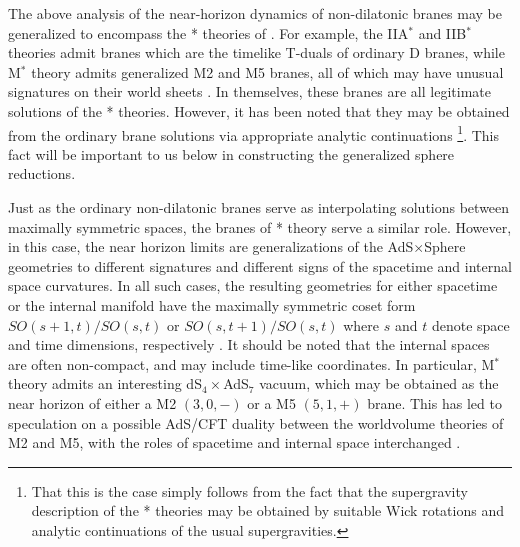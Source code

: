 \documentclass[a4paper,12pt]{article}
\begin{document}
The above analysis of the near-horizon dynamics of non-dilatonic branes
may be generalized to encompass the * theories of \cite{Hull:1998vg,Hull2}.
For example, the IIA$^*$ and IIB$^*$ theories admit branes which are the
timelike T-duals of ordinary D branes, while M$^*$ theory admits
generalized M2 and M5 branes, all of which may have unusual signatures
on their world sheets \cite{Hull3,Hull4}.  In themselves, these branes
are all legitimate solutions of the * theories.  However, it has been
noted that they may be obtained from the ordinary brane solutions via
appropriate analytic continuations%
%
\footnote{That this is the case simply follows from the fact that the
supergravity description of the * theories may be obtained by suitable
Wick rotations and analytic continuations of the usual supergravities.}.
%
This fact will be important to us below in constructing the generalized
sphere reductions.

Just as the ordinary non-dilatonic branes serve as interpolating
solutions between maximally symmetric spaces, the branes of * theory
serve a similar role.  However, in this case, the near horizon limits
are generalizations of the AdS$\times$Sphere geometries to different
signatures and different signs of the spacetime and internal space
curvatures.  In all such cases, the resulting geometries for either
spacetime or the internal manifold have the maximally symmetric coset
form $SO(s+1,t)/SO(s,t)$ or $SO(s,t+1)/SO(s,t)$ where $s$ and $t$ denote
space and time dimensions, respectively \cite{Hull4}.  It should be
noted that the internal spaces are often non-compact, and may include
time-like coordinates.  In particular, M$^*$ theory admits
an interesting dS$_4\times$AdS$_7$ vacuum, which may be obtained as the
near horizon of either a M2 $(3,0,-)$ or a M5 $(5,1,+)$ brane.  This has
led to speculation on a possible AdS/CFT duality between the worldvolume
theories of M2 and M5, with the roles of spacetime and internal space
interchanged \cite{Batrachenko:2002pu}.
\end{document}
